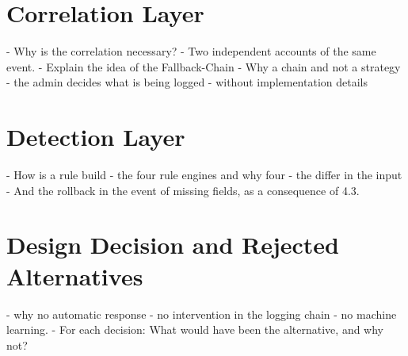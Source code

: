 \documentclass[../main.tex]{subfiles}
\begin{document}
\section{Correlation Layer}\label{sec:correlation}
- Why is the correlation necessary?
- Two independent accounts of the same event.
- Explain the idea of the Fallback-Chain
- Why a chain and not a strategy
    - the admin decides what is being logged
- without implementation details

\section{Detection Layer}\label{sec:detection}
- How is a rule build
- the four rule engines and why four
    - the differ in the input
- And the rollback in the event of missing fields, as a consequence of 4.3.

\section{Design Decision and Rejected Alternatives}\label{sec:design}
- why no automatic response
- no intervention in the logging chain
- no machine learning.
- For each decision: What would have been the alternative, and why not?
\end{document}
